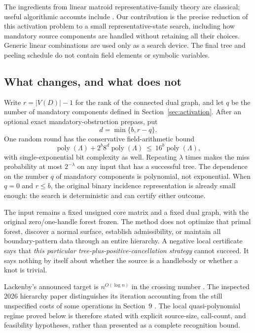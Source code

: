 \documentclass[11pt,letterpaper]{article}
\theoremstyle{definition}
\newcommand{\poly}{\operatorname{poly}}
\begin{document}
The ingredients from linear matroid representative-family theory are
classical; useful algorithmic accounts include \cite{fomin,bevern}. Our
contribution is the precise reduction of this activation problem to a small
representative-state search, including how mandatory source components are
handled without retaining all their choices. Generic linear combinations are
used only as a search device. The final tree and peeling schedule do not
contain field elements or symbolic variables.

\subsection{What changes, and what does not}
Write $r=|V(D)|-1$ for the rank of the connected dual graph, and let $q$ be the
number of mandatory components defined in Section~\ref{sec:activation}. After
an optional exact mandatory-obstruction prepass, put
\[
 d=\min\{b,r-q\}.
\]
One random round has the conservative field-arithmetic bound
\begin{equation}\label{eq:headline}
 \poly(\Lambda)+2^b8^d\poly(\Lambda)
 \ \leq\ 16^b\poly(\Lambda),
\end{equation}
with single-exponential bit complexity as well. Repeating $\lambda$ times
makes the miss probability at most $2^{-\lambda}$ on any input that has a
successful tree. The dependence on the number $q$ of mandatory components is
polynomial, not exponential. When $q=0$ and $r\leq b$, the original binary
incidence representation is already small enough: the search is deterministic
and can certify either outcome.

The input remains a fixed unsigned core matrix and a fixed dual graph, with
the original zero/one-handle forest frozen. The method does not optimize that
primal forest, discover a normal surface, establish admissibility, or maintain
all boundary-pattern data through an entire hierarchy. A negative local
certificate says that \emph{this particular tree-plus-positive-cancellation
strategy} cannot succeed. It says nothing by itself about whether the source
is a handlebody or whether a knot is trivial.

Lackenby's announced target is $n^{O(\log n)}$ in the crossing number
\cite{announcement}. The inspected 2026 hierarchy paper distinguishes its
iteration accounting from the still unspecified costs of some operations in
Section~9 \cite{lackenby}. The local quasi-polynomial regime proved below is
therefore stated with explicit source-size, call-count, and feasibility
hypotheses, rather than presented as a complete recognition bound.
\end{document}
